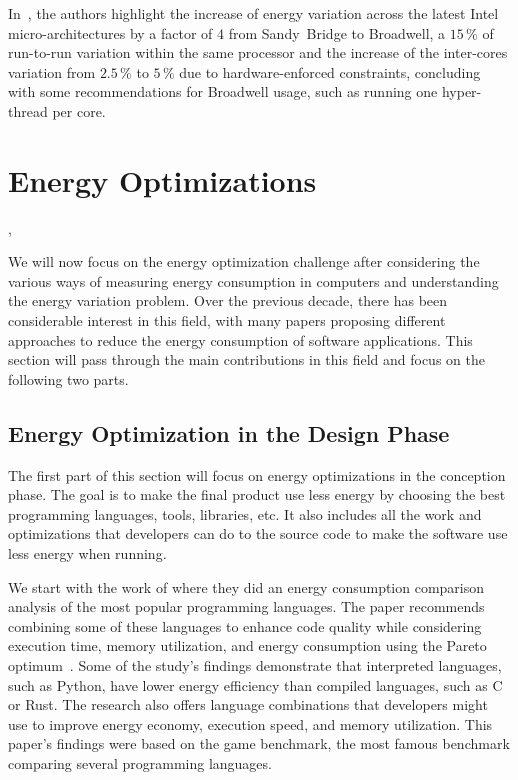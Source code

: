 In~\cite{marathe_empirical_2017_m}, the authors highlight the increase of energy variation across the latest Intel micro-architectures by a factor of $4$ from Sandy~Bridge to Broadwell, a $15\,\%$ of run-to-run variation within the same processor and the increase of the inter-cores variation from $2.5\,\%$ to $5\,\%$ due to hardware-enforced constraints, concluding with some recommendations for Broadwell usage, such as running one hyper-thread per core.

\section{Energy Optimizations}\label{section:soa_energyoptimization},

We will now focus on the energy optimization challenge after considering the various ways of measuring energy consumption in computers and understanding the energy variation problem.
Over the previous decade, there has been considerable interest in this field, with many papers proposing different approaches to reduce the energy consumption of software applications. This section will pass through the main contributions in this field and focus on the following two parts.

\subsection{Energy Optimization in the Design Phase}
The first part of this section will focus on energy optimizations in the conception phase. The goal is to make the final product use less energy by choosing the best programming languages, tools, libraries, etc. It also includes all the work and optimizations that developers can do to the source code to make the software use less energy when running.

We start with the work of \citeauthor{pereira_energy_2017} where they did an energy consumption comparison analysis of the most popular programming languages.
The paper recommends combining some of these languages to enhance code quality while considering execution time, memory utilization, and energy consumption using the Pareto optimum~\cite{hochman1969pareto}. Some of the study's findings demonstrate that interpreted languages, such as Python, have lower energy efficiency than compiled languages, such as C or Rust. The research also offers language combinations that developers might use to improve energy economy, execution speed, and memory utilization.
This paper's findings were based on the game benchmark, the most famous benchmark comparing several programming languages.


